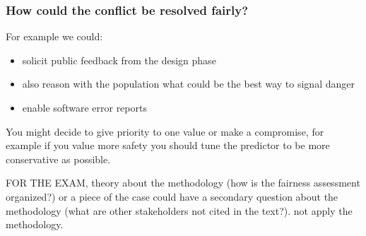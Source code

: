\subsubsection{How could the conflict be resolved fairly?}
For example we could:
\begin{itemize}
    \item solicit public feedback from the design phase
    \item also reason with the population what could be the best way to signal danger
    \item enable software error reports
\end{itemize}
You might decide to give priority to one value or make a compromise, for example if you value more safety you should tune the predictor to be more conservative as possible.

FOR THE EXAM, theory about the methodology (how is the fairness assessment organized?) or a piece of the case could have a secondary question about the methodology (what are other stakeholders not cited in the text?). not apply the methodology.
